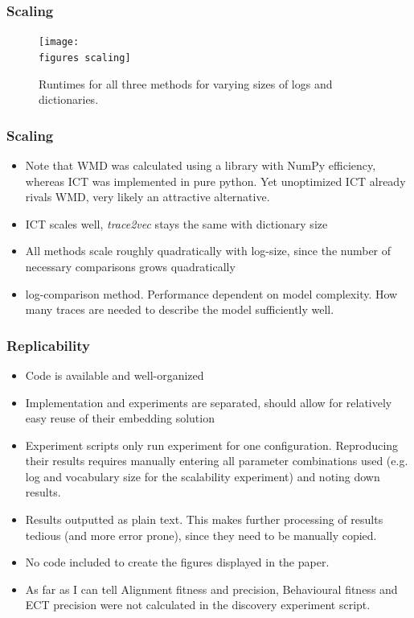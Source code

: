 \documentclass{beamer}
\newcommand{\figures}{../figures/}
\newcommand{\pro}{\item[\color{green}\textbf{+}\color{black}]}
\newcommand{\con}{\item[\color{red}\boldmath{$-$}\color{black}]}
\begin{document}
	
	\begin{frame}
		\frametitle{Scaling}
		\begin{figure}
			\texttt{[image: \\figures scaling]}
			\caption{Runtimes for all three methods for varying sizes of logs and dictionaries.}
			\label{fig:scalability}
		\end{figure}
	\end{frame}
	
	
	\begin{frame}
		\frametitle{Scaling}
		\begin{itemize}
			\item Note that WMD was calculated using a library with NumPy efficiency, whereas ICT was implemented in pure python. Yet unoptimized ICT already rivals WMD, very likely an attractive alternative.
			\item ICT scales well, \emph{trace2vec} stays the same with dictionary size
			\item All methods scale roughly quadratically with log-size, since the number of necessary comparisons grows quadratically
			\item log-comparison method. Performance dependent on model complexity. How many traces are needed to describe the model sufficiently well.
		\end{itemize}
	\end{frame}
	
	\begin{frame}
		\frametitle{Replicability}
		\begin{itemize}
			 \pro<1-> Code  is available and well-organized
			 \pro<2-> Implementation and experiments are separated, should allow for relatively easy reuse of their embedding solution
			 \con<3-> Experiment scripts only run experiment for one configuration. Reproducing their results requires manually entering all parameter combinations used (e.g. log and vocabulary size for the scalability experiment) and noting down results.
			 \con<4-> Results outputted as plain text. This makes further processing of results tedious (and more error prone), since they need to be manually copied.
			 \con<5-> No code included to create the figures displayed in the paper.
			 \con<6-> As far as I can tell Alignment fitness and precision, Behavioural fitness and ECT precision were not calculated in the discovery experiment script.
		\end{itemize}
	\end{frame}
	
\end{document}
